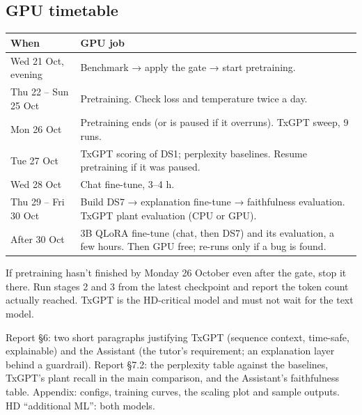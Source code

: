 \subsection{GPU timetable}

\begin{center}
\small
\begin{tabularx}{\textwidth}{@{}L{3.4cm}Y@{}}
\toprule
\textbf{When} & \textbf{GPU job} \\
\midrule
Wed 21 Oct, evening & Benchmark → apply the gate → start pretraining. \\
Thu 22 -- Sun 25 Oct & Pretraining. Check loss and temperature twice a day. \\
Mon 26 Oct & Pretraining ends (or is paused if it overruns). TxGPT sweep, 9 runs. \\
Tue 27 Oct & TxGPT scoring of DS1; perplexity baselines. Resume pretraining if it was paused. \\
Wed 28 Oct & Chat fine-tune, 3--4 h. \\
Thu 29 -- Fri 30 Oct & Build DS7 → explanation fine-tune → faithfulness evaluation. TxGPT plant evaluation (CPU or GPU). \\
After 30 Oct & 3B QLoRA fine-tune (chat, then DS7) and its evaluation, a few hours. Then GPU free; re-runs only if a bug is found. \\
\bottomrule
\end{tabularx}
\end{center}

\begin{caution}
If pretraining hasn't finished by Monday 26 October even after the gate, stop it there. Run
stages 2 and 3 from the latest checkpoint and report the token count actually reached. TxGPT is
the HD-critical model and must not wait for the text model.
\end{caution}

\begin{feeds}
Report §6: two short paragraphs justifying TxGPT (sequence context, time-safe, explainable) and
the Assistant (the tutor's requirement; an explanation layer behind a guardrail). Report §7.2:
the perplexity table against the baselines, TxGPT's plant recall in the main comparison, and the
Assistant's faithfulness table. Appendix: configs, training curves, the scaling plot and sample
outputs. HD ``additional ML'': both models.
\end{feeds}
